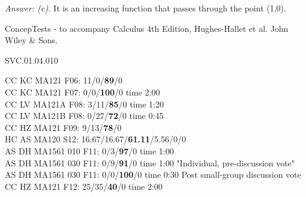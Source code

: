 {\it Answer: (c).}  It is an increasing function that passes through the point (1,0). 


\medskip
ConcepTests - to accompany Calculus 4th Edition, Hughes-Hallet et al. John Wiley \& Sons.

SVC.01.04.010


CC KC MA121 F06: 11/0/{\bf 89}/0 \\
CC KC MA121 F07: 0/0/{\bf 100}/0 time 2:00\\
CC LV MA121A F08: 3/11/{\bf85}/0 time 1:20\\
CC LV MA121B F08: 0/27/{\bf72}/0 time 0:45\\
CC HZ MA121 F09: 9/13/{\bf78}/0  \\
HC AS MA120 S12: 16.67/16.67/{\bf61.11}/5.56/0/0  \\
AS DH MA1561 010 F11: 0/3/{\bf97}/0 time 1:00  \\
AS DH MA1561 030 F11: 0/9/{\bf91}/0 time 1:00 "Individual, pre-discussion vote" \\
AS DH MA1561 030 F11: 0/0/{\bf100}/0 time 0:30 Post small-group discussion vote \\
CC HZ MA121 F12: 25/35/{\bf40}/0 time 2:00  \\
